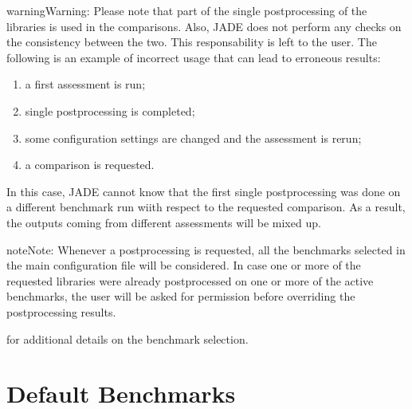 \documentclass[letterpaper,10pt,english]{sphinxmanual}
\begin{document}
\begin{sphinxadmonition}{warning}{Warning:}
Please note that part of the single post\sphinxhyphen{}processing of the libraries is used in the comparisons. Also, JADE does not perform
any checks on the consistency between the two. This responsability is left to the user.
The following is an example of incorrect usage that can lead to erroneous results:
\begin{enumerate}
%
\item {} 
a first assessment is run;

\item {} 
single post\sphinxhyphen{}processing is completed;

\item {} 
some configuration settings are changed and the assessment is re\sphinxhyphen{}run;

\item {} 
a comparison is requested.

\end{enumerate}

In this case, JADE cannot know that the first single post\sphinxhyphen{}processing was done on a different benchmark run wiith respect
to the requested comparison. As a result, the outputs coming from different assessments will be mixed up.
\end{sphinxadmonition}

\begin{sphinxadmonition}{note}{Note:}
Whenever a post\sphinxhyphen{}processing is requested, all the benchmarks selected in the main configuration file will be considered.
In case one or more of the requested libraries were already post\sphinxhyphen{}processed on one or more of the active benchmarks,
the user will be asked for permission before overriding the post\sphinxhyphen{}processing results.
\end{sphinxadmonition}




{\hyperref[\detokenize{usage/configuration:config}]{}} for additional details on the benchmark selection.




\chapter{Default Benchmarks}
\label{\detokenize{usage/benchmarks:default-benchmarks}}\label{\detokenize{usage/benchmarks::doc}}
\end{document}
